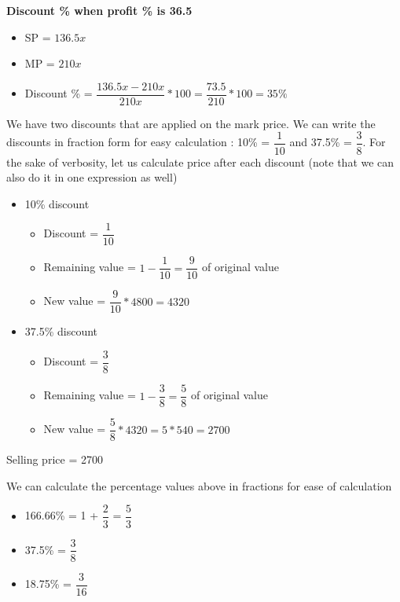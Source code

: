 \textbf{Discount \% when profit \% is 36.5}
\begin{itemize}
    \item SP = $136.5x$
    \item MP = $210x$
    \item Discount \% = $\dfrac{136.5x - 210x}{210x} * 100 = \dfrac{73.5}{210} * 100 = 35\%$
\end{itemize}


We have two discounts that are applied on the mark price. We can write the discounts in fraction form for easy calculation : 10\% = $\dfrac{1}{10}$ and 37.5\% = $\dfrac{3}{8}$. For the sake of verbosity, let us calculate price after each discount (note that we can also do it in one expression as well)

\begin{itemize}
    \item 10\% discount
    \begin{itemize}
        \item Discount = $\dfrac{1}{10}$
        \item Remaining value = $1 - \dfrac{1}{10} = \dfrac{9}{10} $ of original value
        \item New value = $\dfrac{9}{10} * 4800 = 4320$
    \end{itemize}

    \item 37.5\% discount
    \begin{itemize}
        \item Discount = $\dfrac{3}{8}$
        \item Remaining value = $1 - \dfrac{3}{8} = \dfrac{5}{8}$ of original value
        \item New value = $\dfrac{5}{8} * 4320 = 5 * 540 = 2700$
    \end{itemize}
\end{itemize}

Selling price = 2700


We can calculate the percentage values above in fractions for ease of calculation
\begin{itemize}
    \item 166.66\% = 1 + $\dfrac{2}{3}$ = $\dfrac{5}{3}$
    \item 37.5\% = $\dfrac{3}{8}$
    \item 18.75\% = $\dfrac{3}{16}$
\end{itemize}


